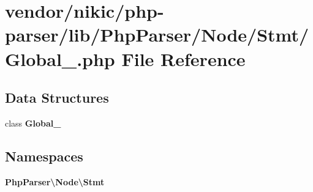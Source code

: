 \section{vendor/nikic/php-\/parser/lib/\+Php\+Parser/\+Node/\+Stmt/\+Global\+\_\+.php File Reference}
\label{_global___8php}
\subsection*{Data Structures}
\begin{DoxyCompactItemize}
\item 
class {\bf Global\+\_\+}
\end{DoxyCompactItemize}
\subsection*{Namespaces}
\begin{DoxyCompactItemize}
\item 
 {\bf Php\+Parser\textbackslash{}\+Node\textbackslash{}\+Stmt}
\end{DoxyCompactItemize}
